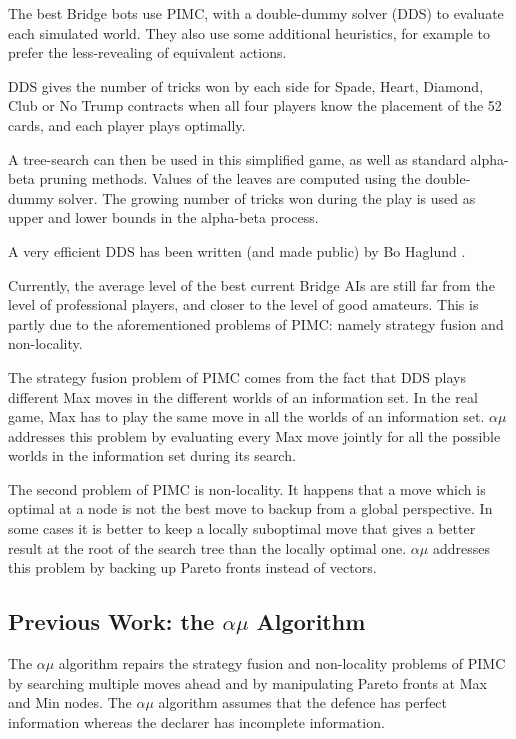 \documentclass[letterpaper]{article} %
\begin{document}
The best Bridge bots use PIMC, with a double-dummy solver (DDS) to evaluate each simulated world.  They also use some additional heuristics, for example to prefer the less-revealing of equivalent actions.

DDS  gives the number of tricks won by each side for Spade, Heart, Diamond, Club or No Trump contracts  when all four players know the placement of the 52 cards, and each player plays optimally. 

A tree-search can then be used in this simplified game, as well as standard alpha-beta pruning methods. Values of the leaves are computed using the double-dummy solver. The growing number of tricks won during the play is used as upper and lower bounds in the alpha-beta process. 

A very efficient DDS has been written (and made public) by Bo Haglund \cite{haglund2010search}.

Currently, the  average level of the best current Bridge AIs are still far from the level of professional players, and closer to the level of good amateurs. This is partly due to the aforementioned problems of PIMC: namely strategy fusion and non-locality.

The strategy fusion problem of PIMC comes from the fact that DDS plays different Max moves in the different worlds of an information set. In the real game, Max has to play the same move in all the worlds of an information set. $\alpha\mu$ addresses this problem by evaluating every Max move jointly for all the possible worlds in the information set during its search. 

The second  problem of PIMC is non-locality. It happens that a move which is optimal at a node is not the best move to backup from a global perspective. In some cases it is better to keep a locally suboptimal move that gives a better result at the root of the search tree than the locally optimal one. $\alpha\mu$ addresses this problem by backing up Pareto fronts instead of vectors.

\subsection{Previous Work: the $\alpha\mu$ Algorithm}

The $\alpha\mu$ algorithm repairs the strategy fusion and non-locality problems of PIMC by searching multiple moves ahead and by manipulating Pareto fronts at Max and Min nodes. The $\alpha\mu$ algorithm assumes that the defence has perfect information whereas the declarer has incomplete information.
\end{document}
